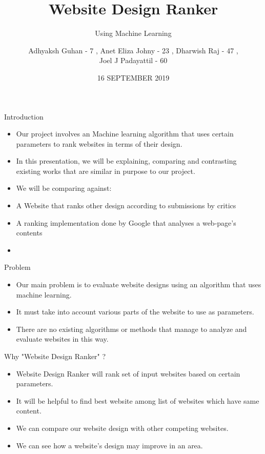 \documentclass[11pt]{beamer}
\begin{document}
	\title{\textbf{Website Design Ranker}}
	\subtitle{Using Machine Learning}
	\date{16 SEPTEMBER 2019}
	\author{{\scriptsize Adhyaksh Guhan - 7 , Anet Eliza Johny - 23 , Dharwish Raj - 47 , \\ Joel J Padayattil - 60}}
	\begin{frame}[plain]
		\maketitle
	\end{frame}
	\begin{frame}{Introduction}
		\begin{itemize}
			\item Our project involves an Machine learning algorithm that uses certain parameters to rank websites in terms of their design.
			
			\item In this presentation, we will be explaining, comparing and contrasting existing works that are similar in purpose to our project.
		
			\item We will be comparing against:
				\item A Website that ranks other design according to submissions by critics
				\item A ranking implementation done by Google that analyses a web-page's contents
				\item 
		\end{itemize}
	\end{frame}
	\begin{frame}{Problem}
		\begin{itemize}
			\item Our main problem is to evaluate website designs using an algorithm that uses machine learning.
			\item It must take into account various parts of the website to use as parameters.
			\item There are no existing algorithms or methods that manage to analyze and evaluate websites in this way.
		\end{itemize}
	\end{frame}
	\begin{frame}{Why "Website Design Ranker" ?}
			\begin{itemize}
			\item Website Design Ranker will rank set of input websites based on certain parameters.
			\item It will be helpful to find best website among list of websites which have same content.
			\item We can compare our website design with other competing websites.
			\item We can see how a website's design may improve in an area.

		\end{itemize}
	\end{frame}
\end{document}
